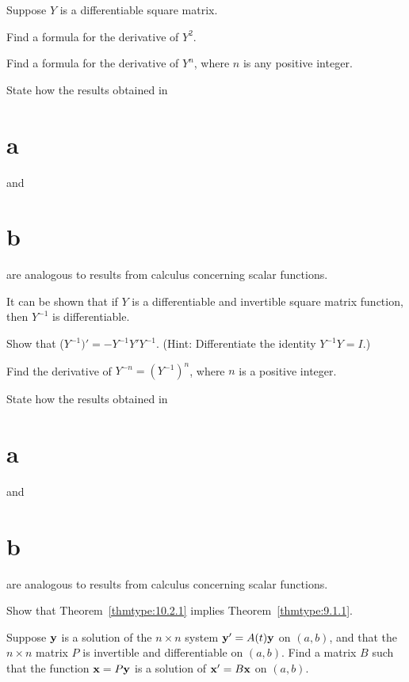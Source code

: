 \begin{exerciselist}
  \item\label{exer:10.2.10} Suppose $Y$ is a differentiable square matrix.
  \begin{alist}
    \item %
    Find a formula for the derivative of $Y^{2}$.

    \item %
    Find a formula for the derivative of $Y^{n}$, where $n$ is any positive integer.

    \item %
    State how the results obtained in \part{a} and \part{b} are analogous to results from calculus
    concerning scalar functions.
  \end{alist}

  \item\label{exer:10.2.11} It can be shown that if $Y$ is a differentiable and invertible square
        matrix function, then $Y^{-1}$ is differentiable.

  \begin{alist}
    \item %
    Show that ($Y^{-1})'= -Y^{-1}Y'Y^{-1}$. (Hint: Differentiate the identity $Y^{-1}Y=I$.)

    \item %
    Find the derivative of $Y^{-n}=\left(Y^{-1}\right)^{n}$, where $n$ is a positive integer.

    \item %
    State how the results obtained in \part{a} and \part{b} are analogous to results from calculus
    concerning scalar functions.
  \end{alist}

  \item\label{exer:10.2.12} Show that Theorem~\ref{thmtype:10.2.1} implies
        Theorem~\ref{thmtype:9.1.1}. 

  \item\label{exer:10.2.13} Suppose ${\bf y}$ is a solution of the $n\times n$ system
        ${\bf y}'=A(t){\bf y}$ on $(a,b)$, and that the $n\times n$ matrix $P$ is invertible and
        differentiable on $(a,b)$. Find a matrix $B$ such that the function ${\bf x}=P{\bf y}$ is a
        solution of ${\bf x}'=B{\bf x}$ on $(a,b)$.
\end{exerciselist}
